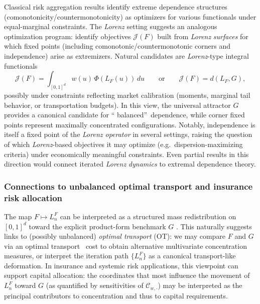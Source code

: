 \documentclass[onecolumn]{article}
\begin{document}
Classical risk aggregation results identify extreme dependence structures
(comonotonicity/countermonotonicity) as optimizers for various functionals
under equal-marginal constraints. The \textit{Lorenz} setting suggests an
analogous optimization program: identify objectives $\mathcal{J}(F)$ built
from \textit{Lorenz} \textit{surfaces} for which fixed points (including
comonotonic/countermonotonic corners and independence) arise as extremizers.
Natural candidates are \textit{Lorenz}-type integral functionals 
\begin{equation}
\mathcal{J}(F)=\int_{[0,1]^{d}}w(u)\,\Phi \!(L_{F}(u))\,du\qquad \text{or}%
\qquad \mathcal{J}(F)=d(L_{F},G),  \label{2087}
\end{equation}%
possibly under constraints reflecting market calibration (moments, marginal
tail behavior, or transportation budgets). In this view, the universal
attractor $G$ provides a canonical candidate for \textquotedblleft
balanced\textquotedblright\ dependence, while corner fixed points represent
maximally concentrated configurations. Notably, independence is itself a
fixed point of the \textit{Lorenz operator} in several settings, raising the
question of which \textit{Lorenz}-based objectives it may optimize (e.g.\
dispersion-maximizing criteria) under economically meaningful constraints.
Even partial results in this direction would connect iterated \textit{Lorenz}
\textit{dynamics} to extremal dependence theory.

\subsubsection{Connections to unbalanced optimal transport and insurance
risk allocation}

The map $F\mapsto L_{n}^{F}$ can be interpreted as a structured mass
redistribution on $[0,1]^{d}$ toward the explicit product-form benchmark $G$%
. This naturally suggests links to (possibly unbalanced) \textit{optimal
transport }(OT): we may compare $F$ and $G$ via an optimal transport\textit{%
\ }cost to obtain alternative multivariate concentration measures, or
interpret the iteration path $\{L_{n}^{F}\}$ as a canonical transport-like
deformation. In insurance and systemic risk applications, this viewpoint can
support capital allocation: the coordinates that most influence the movement
of $L_{n}^{F}$ toward $G$ (as quantified by sensitivities of $\mathcal{C}%
_{w,\cdot }$) may be interpreted as the principal contributors to
concentration and thus to capital requirements.
\end{document}

